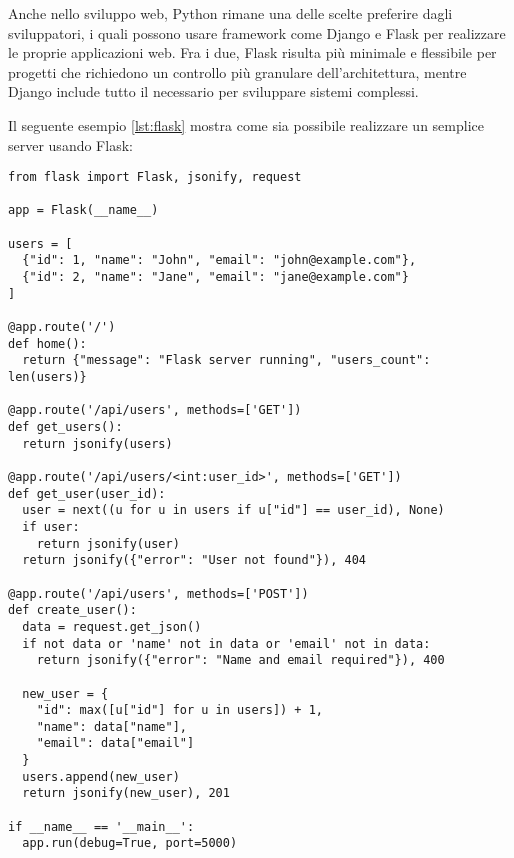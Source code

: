 Anche nello sviluppo web, Python rimane una delle scelte preferire dagli sviluppatori, i quali possono usare framework
come Django e Flask \citep{django_2023, flask_2023} per realizzare le proprie applicazioni web.
Fra i due, Flask risulta più minimale e flessibile per progetti che richiedono un controllo più granulare
dell'architettura, mentre Django include tutto il necessario per sviluppare sistemi complessi.

Il seguente esempio \ref{lst:flask} mostra come sia possibile realizzare un semplice server usando Flask:

\begin{lstlisting}[caption={Server Flask base in Python}, label=lst:flask]
from flask import Flask, jsonify, request

app = Flask(__name__)

users = [
  {"id": 1, "name": "John", "email": "john@example.com"},
  {"id": 2, "name": "Jane", "email": "jane@example.com"}
]

@app.route('/')
def home():
  return {"message": "Flask server running", "users_count": len(users)}

@app.route('/api/users', methods=['GET'])
def get_users():
  return jsonify(users)

@app.route('/api/users/<int:user_id>', methods=['GET'])
def get_user(user_id):
  user = next((u for u in users if u["id"] == user_id), None)
  if user:
    return jsonify(user)
  return jsonify({"error": "User not found"}), 404

@app.route('/api/users', methods=['POST'])
def create_user():
  data = request.get_json()
  if not data or 'name' not in data or 'email' not in data:
    return jsonify({"error": "Name and email required"}), 400

  new_user = {
    "id": max([u["id"] for u in users]) + 1,
    "name": data["name"],
    "email": data["email"]
  }
  users.append(new_user)
  return jsonify(new_user), 201

if __name__ == '__main__':
  app.run(debug=True, port=5000)
\end{lstlisting}

